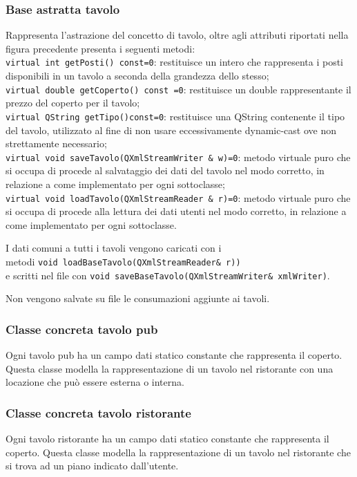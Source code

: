 \subsubsection{Base astratta tavolo}
Rappresenta l'astrazione del concetto di tavolo, oltre agli attributi riportati nella figura precedente presenta i seguenti metodi:\\
\textbullet \verb|virtual int getPosti() const=0|:
restituisce un intero che rappresenta i posti disponibili in un tavolo a seconda della grandezza dello stesso;
\\
\textbullet \verb|virtual double getCoperto() const =0|:
restituisce un double rappresentante il prezzo del coperto per il tavolo;
\\
\textbullet \verb|virtual QString getTipo()const=0|:
restituisce una QString contenente il tipo del tavolo, utilizzato al fine di non usare eccessivamente dynamic-cast ove non strettamente necessario;
\\
\textbullet \verb|virtual void saveTavolo(QXmlStreamWriter & w)=0|:
metodo virtuale puro che si occupa di procede al salvataggio dei dati del tavolo nel modo corretto, in relazione a come implementato per ogni sottoclasse;
\\
\textbullet \verb|virtual void loadTavolo(QXmlStreamReader & r)=0|:
metodo virtuale puro che si occupa di procede alla lettura dei dati utenti nel modo corretto, in relazione a come implementato per ogni sottoclasse.

I dati comuni a tutti i tavoli vengono caricati con i \\
metodi \verb|void loadBaseTavolo(QXmlStreamReader& r))| \\
e scritti nel file con  \verb|void saveBaseTavolo(QXmlStreamWriter& xmlWriter)|.

Non vengono salvate su file le consumazioni aggiunte ai tavoli.
    
\subsubsection{Classe concreta tavolo pub}
Ogni tavolo pub ha un campo dati statico constante che rappresenta il coperto.
Questa classe modella la rappresentazione di un tavolo nel ristorante con una locazione che può essere esterna o interna. 
\subsubsection{Classe concreta tavolo ristorante}
Ogni tavolo ristorante ha un campo dati statico constante che rappresenta il coperto.
Questa classe modella la rappresentazione di un tavolo nel ristorante che si trova ad un piano indicato dall'utente.
